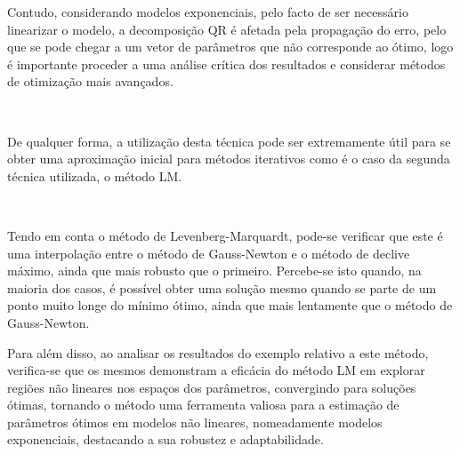 \documentclass[]{article}
\numberwithin{equation}{subsection}
\begin{document}
Contudo, considerando modelos exponenciais, pelo facto de ser necessário
linearizar o modelo, a decomposição QR é afetada pela propagação do
erro, pelo que se pode chegar a um vetor de parâmetros que não
corresponde ao ótimo, logo é importante proceder a uma análise crítica
dos resultados e considerar métodos de otimização mais avançados.

\(\ \)

De qualquer forma, a utilização desta técnica pode ser extremamente útil
para se obter uma aproximação inicial para métodos iterativos como é o
caso da segunda técnica utilizada, o método LM.

\(\ \)

Tendo em conta o método de Levenberg-Marquardt, pode-se verificar que
este é uma interpolação entre o método de Gauss-Newton e o método de
declive máximo, ainda que mais robusto que o primeiro. Percebe-se isto
quando, na maioria dos casos, é possível obter uma solução mesmo quando
se parte de um ponto muito longe do mínimo ótimo, ainda que mais
lentamente que o método de Gauss-Newton.

Para além disso, ao analisar os resultados do exemplo relativo a este
método, verifica-se que os mesmos demonstram a eficácia do método LM em
explorar regiões não lineares nos espaços dos parâmetros, convergindo
para soluções ótimas, tornando o método uma ferramenta valiosa para a
estimação de parâmetros ótimos em modelos não lineares, nomeadamente
modelos exponenciais, destacando a sua robustez e adaptabilidade.

\newpage


\end{document}
